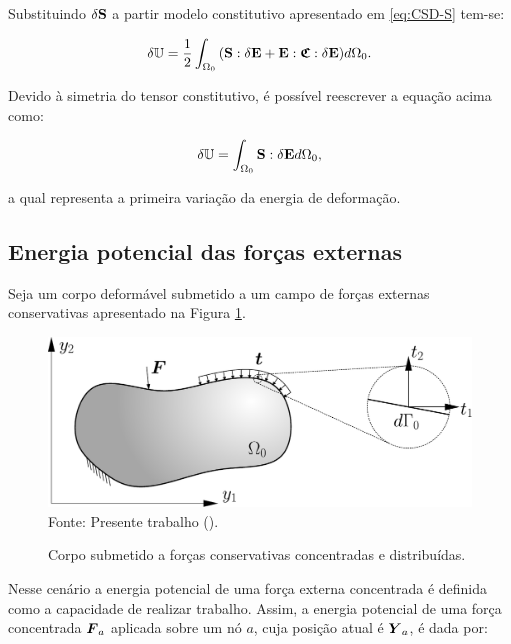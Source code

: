 Substituindo $\delta\mathbf{S}$ a partir modelo constitutivo apresentado em \eqref{eq:CSD-S} tem-se:

\begin{equation}
    \delta\mathbb{U}=\frac{1}{2}\int_{\Omega_0}{(\mathbf{S}:\delta\mathbf{E}+\mathbf{E}:\boldsymbol{\mathfrak{C}}:\delta\mathbf{E}) d\Omega_0}\text{.}
\end{equation}

Devido à simetria do tensor constitutivo, é possível reescrever a equação acima como:

\begin{equation}
    \delta\mathbb{U}=\int_{\Omega_0}{\mathbf{S}:\delta\mathbf{E} d\Omega_0}\text{,}
\end{equation}

\noindent a qual representa a primeira variação da energia de deformação.

\subsection{Energia potencial das forças externas}

Seja um corpo deformável submetido a um campo de forças externas conservativas apresentado na Figura \ref{fig:ForcasExt}.

\begin{figure}[h!]
    \centering
    \caption{Corpo submetido a forças conservativas concentradas e distribuídas.}
    \includegraphics[width=.75\linewidth]{Figuras/EnergForcExt.pdf}
    \\Fonte: Presente trabalho (\the\year).
    \label{fig:ForcasExt}
\end{figure}

Nesse cenário a energia potencial de uma força externa concentrada é definida como a capacidade de realizar trabalho. Assim, a energia potencial de uma força concentrada $\boldsymbol{F}_a$ aplicada sobre um nó $a$, cuja posição atual é $\boldsymbol{Y}_a$, é dada por:

